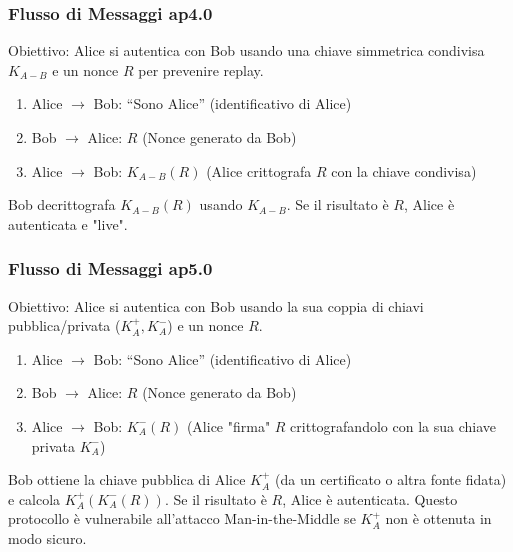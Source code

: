\subsubsection{Flusso di Messaggi ap4.0}
\label{ssubsec:ap4_0_flow}
Obiettivo: Alice si autentica con Bob usando una chiave simmetrica condivisa $K_{A-B}$ e un nonce $R$ per prevenire replay.
\begin{enumerate}
    \item Alice $\rightarrow$ Bob: \textquotedblleft Sono Alice\textquotedblright{} (identificativo di Alice)
    \item Bob $\rightarrow$ Alice: $R$ (Nonce generato da Bob)
    \item Alice $\rightarrow$ Bob: $K_{A-B}(R)$ (Alice crittografa $R$ con la chiave condivisa)
\end{enumerate}
Bob decrittografa $K_{A-B}(R)$ usando $K_{A-B}$. Se il risultato è $R$, Alice è autenticata e "live".

\subsubsection{Flusso di Messaggi ap5.0}
\label{ssubsec:ap5_0_flow}
Obiettivo: Alice si autentica con Bob usando la sua coppia di chiavi pubblica/privata ($K_A^+, K_A^-$) e un nonce $R$.
\begin{enumerate}
    \item Alice $\rightarrow$ Bob: \textquotedblleft Sono Alice\textquotedblright{} (identificativo di Alice)
    \item Bob $\rightarrow$ Alice: $R$ (Nonce generato da Bob)
    \item Alice $\rightarrow$ Bob: $K_A^-(R)$ (Alice "firma" $R$ crittografandolo con la sua chiave privata $K_A^-$)
\end{enumerate}
Bob ottiene la chiave pubblica di Alice $K_A^+$ (da un certificato o altra fonte fidata) e calcola $K_A^+(K_A^-(R))$. Se il risultato è $R$, Alice è autenticata.
Questo protocollo è vulnerabile all'attacco Man-in-the-Middle se $K_A^+$ non è ottenuta in modo sicuro.

